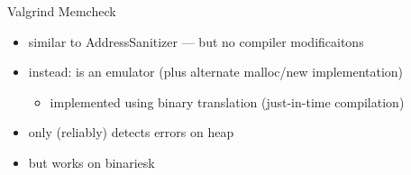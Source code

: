 

\begin{frame}{Valgrind Memcheck}
    \begin{itemize}
    \item similar to AddressSanitizer --- but no compiler modificaitons
    \item instead: is an emulator (plus alternate malloc/new implementation)
        \begin{itemize}
        \item implemented using binary translation (just-in-time compilation)
        \end{itemize}
    \vspace{.5cm}
    \item only (reliably) detects errors on heap
    \item but works on  binariesk
    \end{itemize}
\end{frame}


